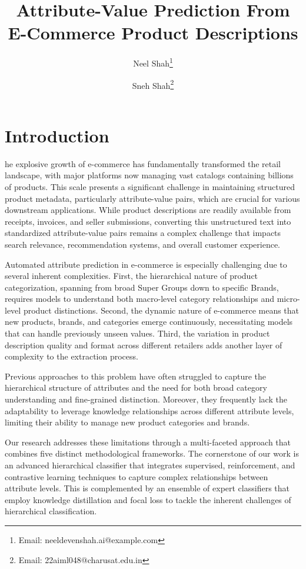 \documentclass[9pt,a4paper,twoside]{rho-class/rho}
\title{Attribute-Value Prediction From E-Commerce Product Descriptions}
\author[1,$\dagger$]{Neel Shah\thanks{Email: neeldevenshah.ai@example.com}}
\author[1,$\dagger$]{Sneh Shah\thanks{Email: 22aiml048@charusat.edu.in}}
\affil[1]{Charotar University of Science and Technology }
\affil[$\dagger$]{These authors contributed equally to this work}
\begin{document}
	
    \maketitle
    \thispagestyle{firststyle}
    \nolinenumbers


\section{Introduction}

    he explosive growth of e-commerce has fundamentally transformed the retail landscape, with major platforms now managing vast catalogs containing billions of products. This scale presents a significant challenge in maintaining structured product metadata, particularly attribute-value pairs, which are crucial for various downstream applications. While product descriptions are readily available from receipts, invoices, and seller submissions, converting this unstructured text into standardized attribute-value pairs remains a complex challenge that impacts search relevance, recommendation systems, and overall customer experience.

    Automated attribute prediction in e-commerce is especially challenging due to several inherent complexities. First, the hierarchical nature of product categorization, spanning from broad Super Groups down to specific Brands, requires models to understand both macro-level category relationships and micro-level product distinctions. Second, the dynamic nature of e-commerce means that new products, brands, and categories emerge continuously, necessitating models that can handle previously unseen values. Third, the variation in product description quality and format across different retailers adds another layer of complexity to the extraction process.
    
    Previous approaches to this problem have often struggled to capture the hierarchical structure of attributes and the need for both broad category understanding and fine-grained distinction. Moreover, they frequently lack the adaptability to leverage knowledge relationships across different attribute levels, limiting their ability to manage new product categories and brands.
    
    Our research addresses these limitations through a multi-faceted approach that combines five distinct methodological frameworks. The cornerstone of our work is an advanced hierarchical classifier that integrates supervised, reinforcement, and contrastive learning techniques to capture complex relationships between attribute levels. This is complemented by an ensemble of expert classifiers that employ knowledge distillation and focal loss to tackle the inherent challenges of hierarchical classification.
    
\end{document}
